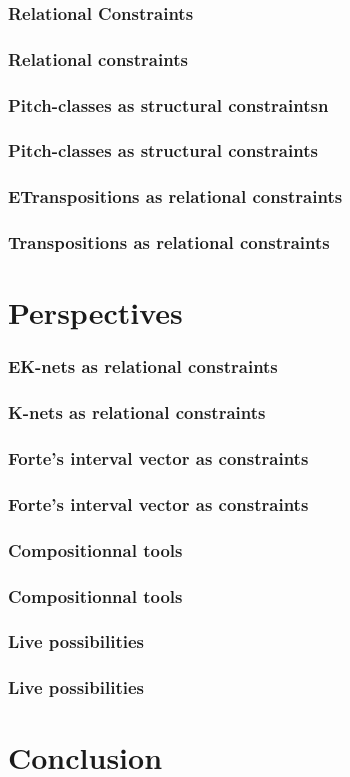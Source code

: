 \documentclass{beamer}
\begin{document}
\subsubsection{Relational Constraints}
\begin{frame}
	\frametitle{Relational constraints}
\end{frame}

\subsubsection{Pitch-classes as structural constraintsn}
\begin{frame}
	\frametitle{Pitch-classes as structural constraints}
\end{frame}

\subsubsection{ETranspositions as relational constraints}
\begin{frame}
	\frametitle{Transpositions as relational constraints}
\end{frame}





\section{Perspectives}
\subsubsection{EK-nets as relational constraints}
\begin{frame}
	\frametitle{K-nets as relational constraints}
\end{frame}

\subsubsection{Forte's interval vector as constraints}
\begin{frame}
	\frametitle{Forte's interval vector as constraints}
\end{frame}

\subsubsection{Compositionnal tools}
\begin{frame}
	\frametitle{Compositionnal tools}
\end{frame}

\subsubsection{Live possibilities}
\begin{frame}
	\frametitle{Live possibilities}
\end{frame}


\section{Conclusion}
\end{document}
